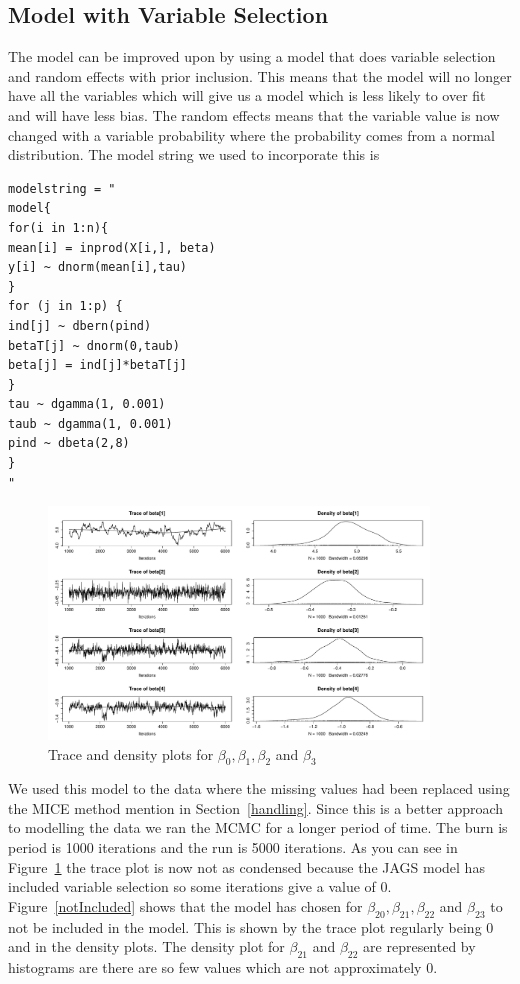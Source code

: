 \documentclass{article}
\begin{document}
\subsection{Model with Variable Selection}
The model can be improved upon by using a model that does variable selection and random effects with prior inclusion. This means that the model will no longer have all the variables which will give us a model which is less likely to over fit and will have less bias. The random effects means that the variable value is now changed with a variable probability where the probability comes from a normal distribution. The model string we used to incorporate this is
\begin{verbatim}
modelstring = "
model{
for(i in 1:n){
mean[i] = inprod(X[i,], beta)
y[i] ~ dnorm(mean[i],tau)
}
for (j in 1:p) {
ind[j] ~ dbern(pind)
betaT[j] ~ dnorm(0,taub)
beta[j] = ind[j]*betaT[j]
}
tau ~ dgamma(1, 0.001)
taub ~ dgamma(1, 0.001)
pind ~ dbeta(2,8)
}
"
\end{verbatim}
\begin{figure}[H]
\centering
\includegraphics[width = 0.9\textwidth]{micePlot.pdf}
\caption{Trace and density plots for $\beta_0, \beta_1, \beta_2$ and $\beta_3$}
\label{micePlot}
\end{figure}
We used this model to the data where the missing values had been replaced using the MICE method mention in Section~\ref{handling}. Since this is a better approach to modelling the data we ran the MCMC for a longer period of time. The burn is period is 1000 iterations and the run is 5000 iterations. As you can see in Figure~\ref{micePlot} the trace plot is now not as condensed because the JAGS model has included variable selection so some iterations give a value of 0. Figure~\ref{notIncluded} shows that the model has chosen for $\beta_{20}, \beta_{21}, \beta_{22}$ and $\beta_{23}$ to not be included in the model. This is shown by the trace plot regularly being 0 and in the density plots. The density plot for $\beta_21$ and $\beta_22$ are represented by histograms are there are so few values which are not approximately 0.
\end{document}
